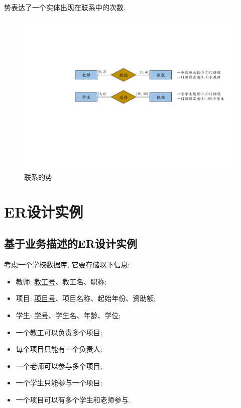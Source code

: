 \begin{definition}[联系的势]
    势表达了一个实体出现在联系中的次数.
\end{definition}

\begin{figure}[H]
    \centering
    \includegraphics[width=.8\textwidth]{figure/联系的势.pdf}
    \caption{联系的势}
\end{figure}

\section{ER设计实例}

\subsection{基于业务描述的ER设计实例}

\begin{example}
    考虑一个学校数据库, 它要存储以下信息:
    \begin{itemize}
        \item 教师: \underline{教工号}、教工名、职称;
        \item 项目: \underline{项目号}、项目名称、起始年份、资助额;
        \item 学生: \underline{学号}、学生名、年龄、学位;
        \item 一个教工可以负责多个项目;
        \item 每个项目只能有一个负责人;
        \item 一个老师可以参与多个项目;
        \item 一个学生只能参与一个项目;
        \item 一个项目可以有多个学生和老师参与.
    \end{itemize}
\end{example}

